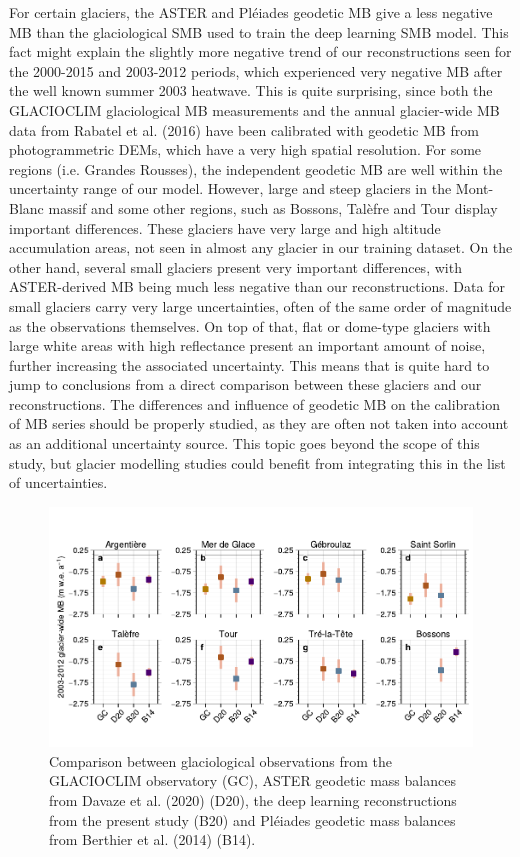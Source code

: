 For certain glaciers, the ASTER and Pléiades geodetic MB give a less negative MB than the glaciological SMB used to train the deep learning SMB model. This fact might explain the slightly more negative trend of our reconstructions seen for the 2000-2015 and 2003-2012 periods, which experienced very negative MB after the well known summer 2003 heatwave. This is quite surprising, since both the GLACIOCLIM glaciological MB measurements and the annual glacier-wide MB data from Rabatel et al. (2016) have been calibrated with geodetic MB from photogrammetric DEMs, which have a very high spatial resolution. For some regions (i.e. Grandes Rousses), the independent geodetic MB are well within the uncertainty range of our model. However, large and steep glaciers in the Mont-Blanc massif and some other regions, such as Bossons, Talèfre and Tour display important differences. These glaciers have very large and high altitude accumulation areas, not seen in almost any glacier in our training dataset. On the other hand, several small glaciers present very important differences, with ASTER-derived MB being much less negative than our reconstructions. Data for small glaciers carry very large uncertainties, often of the same order of magnitude as the observations themselves. On top of that, flat or dome-type glaciers with large white areas with high reflectance present an important amount of noise, further increasing the associated uncertainty. This means that is quite hard to jump to conclusions from a direct comparison between these glaciers and our reconstructions. The differences and influence of geodetic MB on the calibration of MB series should be properly studied, as they are often not taken into account as an additional uncertainty source. This topic goes beyond the scope of this study, but glacier modelling studies could benefit from integrating this in the list of uncertainties. 

\begin{figure}[t]
\centering
\includegraphics[width=12cm]{Figures/past/Figure_S2.pdf}
\captionsetup{justification=centering}
\caption{Comparison between glaciological observations from the GLACIOCLIM observatory (GC), ASTER geodetic mass balances from Davaze et al. (2020) (D20), the deep learning reconstructions from the present study (B20) and Pléiades geodetic mass balances from Berthier et al. (2014) (B14).}
\label{past:figS2}
\end{figure}

